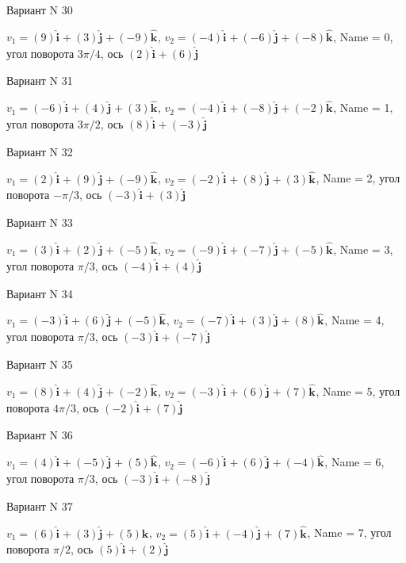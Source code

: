 \documentclass[11pt]{report}
\begin{document}
Вариант N 30

$v_1 = (9)\mathbf{\hat{i}_{}} + (3)\mathbf{\hat{j}_{}} + (-9)\mathbf{\hat{k}_{}}$, $v_2 = (-4)\mathbf{\hat{i}_{}} + (-6)\mathbf{\hat{j}_{}} + (-8)\mathbf{\hat{k}_{}}$, Name = 0, угол поворота $3 \pi / 4$, ось $(2)\mathbf{\hat{i}_{}} + (6)\mathbf{\hat{j}_{}}$

Вариант N 31

$v_1 = (-6)\mathbf{\hat{i}_{}} + (4)\mathbf{\hat{j}_{}} + (3)\mathbf{\hat{k}_{}}$, $v_2 = (-4)\mathbf{\hat{i}_{}} + (-8)\mathbf{\hat{j}_{}} + (-2)\mathbf{\hat{k}_{}}$, Name = 1, угол поворота $3 \pi / 2$, ось $(8)\mathbf{\hat{i}_{}} + (-3)\mathbf{\hat{j}_{}}$

Вариант N 32

$v_1 = (2)\mathbf{\hat{i}_{}} + (9)\mathbf{\hat{j}_{}} + (-9)\mathbf{\hat{k}_{}}$, $v_2 = (-2)\mathbf{\hat{i}_{}} + (8)\mathbf{\hat{j}_{}} + (3)\mathbf{\hat{k}_{}}$, Name = 2, угол поворота $- \pi / 3$, ось $(-3)\mathbf{\hat{i}_{}} + (3)\mathbf{\hat{j}_{}}$

Вариант N 33

$v_1 = (3)\mathbf{\hat{i}_{}} + (2)\mathbf{\hat{j}_{}} + (-5)\mathbf{\hat{k}_{}}$, $v_2 = (-9)\mathbf{\hat{i}_{}} + (-7)\mathbf{\hat{j}_{}} + (-5)\mathbf{\hat{k}_{}}$, Name = 3, угол поворота $\pi / 3$, ось $(-4)\mathbf{\hat{i}_{}} + (4)\mathbf{\hat{j}_{}}$

Вариант N 34

$v_1 = (-3)\mathbf{\hat{i}_{}} + (6)\mathbf{\hat{j}_{}} + (-5)\mathbf{\hat{k}_{}}$, $v_2 = (-7)\mathbf{\hat{i}_{}} + (3)\mathbf{\hat{j}_{}} + (8)\mathbf{\hat{k}_{}}$, Name = 4, угол поворота $\pi / 3$, ось $(-3)\mathbf{\hat{i}_{}} + (-7)\mathbf{\hat{j}_{}}$

Вариант N 35

$v_1 = (8)\mathbf{\hat{i}_{}} + (4)\mathbf{\hat{j}_{}} + (-2)\mathbf{\hat{k}_{}}$, $v_2 = (-3)\mathbf{\hat{i}_{}} + (6)\mathbf{\hat{j}_{}} + (7)\mathbf{\hat{k}_{}}$, Name = 5, угол поворота $4 \pi / 3$, ось $(-2)\mathbf{\hat{i}_{}} + (7)\mathbf{\hat{j}_{}}$

Вариант N 36

$v_1 = (4)\mathbf{\hat{i}_{}} + (-5)\mathbf{\hat{j}_{}} + (5)\mathbf{\hat{k}_{}}$, $v_2 = (-6)\mathbf{\hat{i}_{}} + (6)\mathbf{\hat{j}_{}} + (-4)\mathbf{\hat{k}_{}}$, Name = 6, угол поворота $\pi / 3$, ось $(-3)\mathbf{\hat{i}_{}} + (-8)\mathbf{\hat{j}_{}}$

Вариант N 37

$v_1 = (6)\mathbf{\hat{i}_{}} + (3)\mathbf{\hat{j}_{}} + (5)\mathbf{\hat{k}_{}}$, $v_2 = (5)\mathbf{\hat{i}_{}} + (-4)\mathbf{\hat{j}_{}} + (7)\mathbf{\hat{k}_{}}$, Name = 7, угол поворота $\pi / 2$, ось $(5)\mathbf{\hat{i}_{}} + (2)\mathbf{\hat{j}_{}}$
\end{document}
